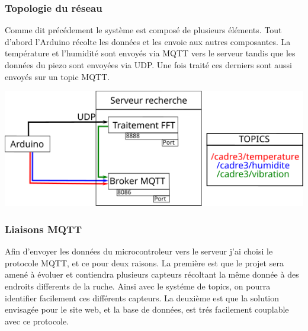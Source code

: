\documentclass[11pt,french,a4paper]{article}
\begin{document}
\subsubsection{Topologie du réseau}
Comme dit précédement le système est composé de plusieurs éléments. Tout d'abord l'Arduino récolte les données et les envoie aux autres composantes. La température et l'humidité sont envoyés via MQTT vers le serveur tandis que les données du piezo sont envoyées via UDP. Une fois traité ces derniers sont aussi envoyés sur un topic MQTT.
\begin{center}
    \includegraphics[scale=1]{../img/schemaNet.png}
    \label{SN}
\end{center}
\subsubsection{Liaisons MQTT}
Afin d'envoyer les données du microcontroleur vers le serveur j'ai choisi le protocole MQTT, et ce pour deux raisons. La première est que le projet sera amené à évoluer et contiendra plusieurs capteurs récoltant la même donnée à des endroits differents de la ruche. Ainsi avec le systéme de topics, on pourra identifier facilement ces différents capteurs. La deuxième est que la solution envisagée pour le site web, et la base de données, est trés facilement couplable avec ce protocole. 
\end{document}
